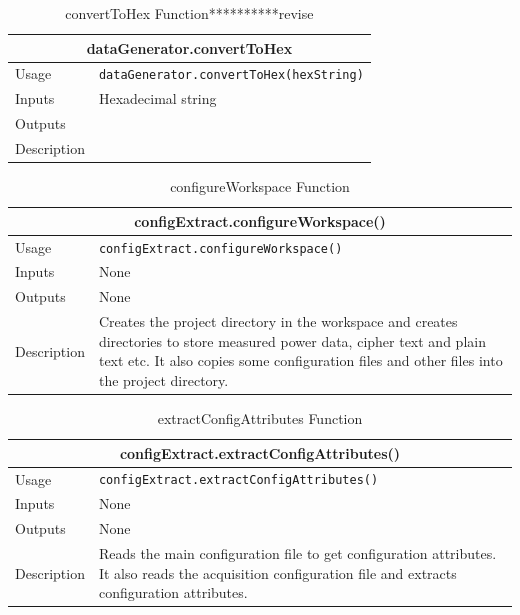 \documentclass{llncs}
\numberwithin{algorithm}{chapter}
\begin{document}
\begin{table}[H]
\caption{convertToHex Function**********revise}
\begin{tabular}{ |p{2cm}||p{11cm}|  }
 \hline
 \multicolumn{2}{|c|}{\cellcolor{teal}\textbf{dataGenerator.convertToHex}} \\
 \hline
 Usage & \texttt{dataGenerator.convertToHex(hexString)}\\ \hline
 Inputs & Hexadecimal string  \\ \hline
 Outputs &  \\ \hline
 Description &  \\ \hline
\end{tabular}
\end{table}
\begin{table}[H]
\caption{configureWorkspace Function}
\begin{tabular}{ |p{2cm}||p{11cm}|  }
 \hline
 \multicolumn{2}{|c|}{\cellcolor{teal}\textbf{configExtract.configureWorkspace()}} \\
 \hline
 Usage & \texttt{configExtract.configureWorkspace()}\\ \hline
 Inputs & None \\ \hline
 Outputs &  None \\ \hline
 Description & Creates the project directory in the workspace and creates directories to store measured power data, cipher text and plain text etc.
 It also copies some configuration files and other files into the project directory. \\ \hline
\end{tabular}
\end{table}

\begin{table}[H]
\caption{extractConfigAttributes Function}
\begin{tabular}{ |p{2cm}||p{11cm}|  }
 \hline
 \multicolumn{2}{|c|}{\cellcolor{teal}\textbf{configExtract.extractConfigAttributes()}} \\
 \hline
 Usage & \texttt{configExtract.extractConfigAttributes()}\\ \hline
 Inputs & None \\ \hline
 Outputs &  None \\ \hline
 Description & Reads the main configuration file to get configuration attributes. It also reads the acquisition configuration file and extracts configuration attributes. \\ \hline
\end{tabular}
\end{table}
\end{document}
